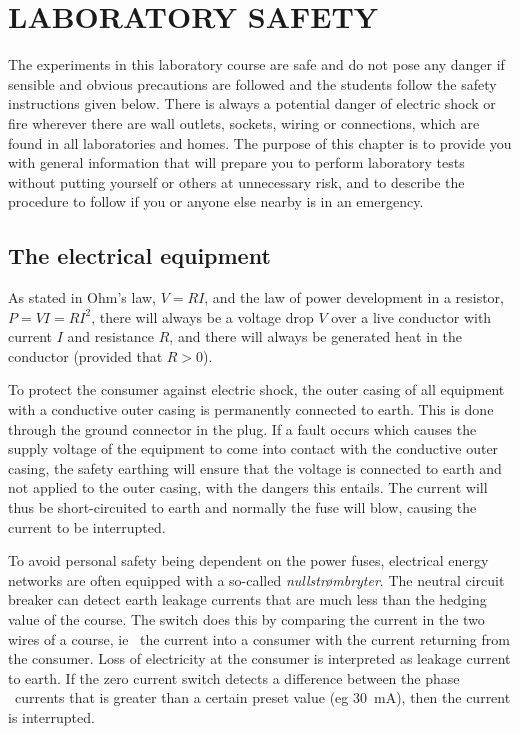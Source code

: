 \documentclass[../Elmag-labhefte-2020.tex]{subfiles}
\begin{document}
\setchapterpreamble[u]{\margintoc}
\chapter{LABORATORY SAFETY \label{ch.elektrisitet}}


The experiments in this laboratory course are safe and do not pose any danger if sensible and obvious precautions are followed and the students follow the safety instructions given below. There is always a potential danger of electric shock or fire wherever there are wall outlets, sockets, wiring or connections, which are found in all laboratories and homes. The purpose of this chapter is to provide you with general information that will prepare you to perform laboratory tests without putting yourself or others at unnecessary risk, and to describe the procedure to follow if you or anyone else nearby is in an emergency.

\section{The electrical equipment}



As stated in Ohm's law, $V = RI$, and the law of power development in a resistor, $P = VI = RI^2$, there will always be a voltage drop $V$ over a live conductor with current $I$ and resistance $R$, and there will always be generated heat in the conductor (provided that $R > 0$).
 

To protect the consumer against electric shock, the outer casing of all equipment with a conductive outer casing is permanently connected to earth. This is done through the ground connector in the plug. If a fault occurs which causes the supply voltage of the equipment to come into contact with the conductive outer casing, the safety earthing will ensure that the voltage is connected to earth and not applied to the outer casing, with the dangers this entails. The current will thus be short-circuited to earth and normally the fuse will blow, causing the current to be interrupted.

To avoid personal safety being dependent on the power fuses, electrical energy networks are often equipped with a so-called \emph{nullstrømbryter}. The neutral circuit breaker can detect earth leakage currents that are much less than the hedging value of the course. The switch does this by comparing the current in the two wires of a course, ie \ the current into a consumer with the current returning from the consumer. Loss of electricity at the consumer is interpreted as leakage current to earth. If the zero current switch detects a difference between the phase \ currents that is greater than a certain preset value (eg \SI{30}{\milli\ampere}), then the current is interrupted.
\end{document}
